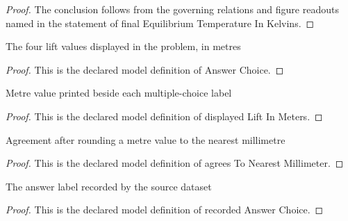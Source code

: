 \begin{proof}
  The conclusion follows from the governing relations and figure readouts named in the statement of final Equilibrium Temperature In Kelvins.
\end{proof}
\begin{definition}
  \label{def:physics:phyx-mini-0436:phyxminiproblems-problemphyxmini0436-answerchoice}
  The four lift values displayed in the problem, in metres
\end{definition}
\begin{proof}
  This is the declared model definition of Answer Choice.
\end{proof}
\begin{definition}
  \label{def:physics:phyx-mini-0436:phyxminiproblems-problemphyxmini0436-displayedliftinmeters}
  Metre value printed beside each multiple-choice label
\end{definition}
\begin{proof}
  This is the declared model definition of displayed Lift In Meters.
\end{proof}
\begin{definition}
  \label{def:physics:phyx-mini-0436:phyxminiproblems-problemphyxmini0436-agreestonearestmillimeter}
  Agreement after rounding a metre value to the nearest millimetre
\end{definition}
\begin{proof}
  This is the declared model definition of agrees To Nearest Millimeter.
\end{proof}
\begin{definition}
  \label{def:physics:phyx-mini-0436:phyxminiproblems-problemphyxmini0436-recordedanswerchoice}
  The answer label recorded by the source dataset
\end{definition}
\begin{proof}
  This is the declared model definition of recorded Answer Choice.
\end{proof}
